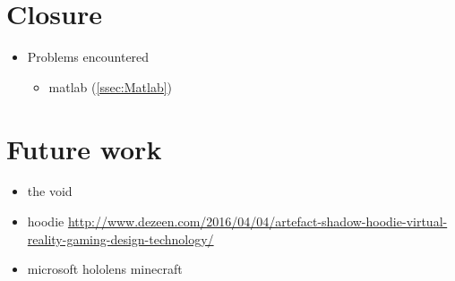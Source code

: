 \section{Closure}
\begin{itemize}
\item Problems encountered
	\begin{itemize}
	\item matlab (\autoref{ssec:Matlab})
	\end{itemize}
\end{itemize}


\section{Future work}

\begin{itemize}
\item the void
\item hoodie \url{http://www.dezeen.com/2016/04/04/artefact-shadow-hoodie-virtual-reality-gaming-design-technology/}
\item microsoft hololens minecraft
	
\end{itemize}
